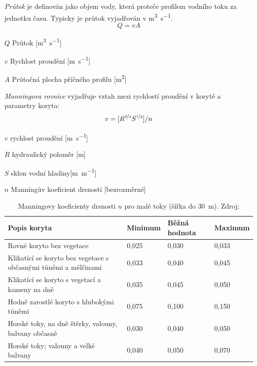 \emph{Průtok} je definován jako objem vody, která proteče profilem vodního toku za jednotku času. Typicky je průtok vyjadřován v \si{\metre\cubed\per\second}. 
\begin{equation}
	Q=vA
\end{equation}
\begin{eqexpl}
	\item{$Q$} Průtok [\si{\metre\cubed\per\second}]
	\item{$v$} Rychlost proudění [\si{\metre\per\second}]
	\item{$A$} Průtočná plocha příčného profilu [\si{\metre\squared}]
\end{eqexpl}


\emph{Manningova rovnice} vyjadřuje vztah mezi rychlostí proudění v korytě a parametry koryta:
\begin{equation}\label{eq:manning}
	v = [R^{\nicefrac{2}{3}}S^{\nicefrac{1}{2}}]/n
\end{equation}

\begin{eqexpl}
	\item{$v$} rychlost proudění [\si{\metre\per\second}]
	\item{$R$} hydraulický poloměr [\si{\metre}]
	\item{$S$} sklon vodní hladiny[\si{\metre\per\metre}]
	\item{$n$} Manningův koeficient drsnosti [bezrozměrné]
\end{eqexpl}

\begin{table}[]
	\begin{tabularx}{1\textwidth}{@{}Xlll@{}}
		\toprule
		Popis koryta                                                    & Minimum & Běžná hodnota & Maximum \\ \midrule
		Rovné koryto bez vegetace                                       & 0,025   & 0,030         & 0,033   \\
		Klikatící se koryto bez vegetace s občasnými tůněmi a mělčinami & 0,033   & 0,040         & 0,045   \\
		Klikatící se koryto s vegetací a kameny na dně                  & 0,035   & 0,045         & 0,050   \\
		Hodně zarostlé koryto s hlubokými tůněmi                        & 0,075   & 0,100         & 0,150   \\
		Horské toky, na dně štěrky, valouny, balvany občasně            & 0,030   & 0,040         & 0,050   \\
		Horské toky; valouny a velké balvany                            & 0,040   & 0,050         & 0,070  \\ \bottomrule
	\end{tabularx}
	\caption{Manningovy koeficienty drsnosti $n$ pro malé toky (šířka do \SI{30}{\metre}). Zdroj: \textcite{chowOpenchannelHydraulics1959}}
	\label{tab:manning}
\end{table}

